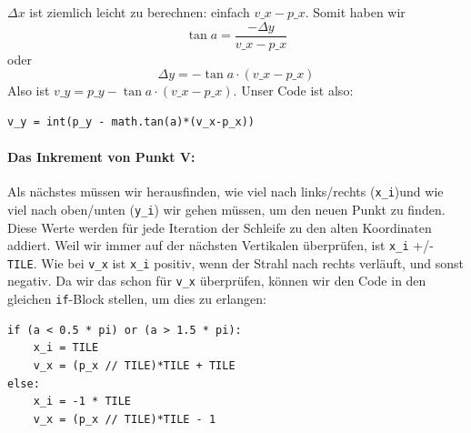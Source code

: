 \documentclass[a4paper,12pt]{report}
\begin{document}
$\Delta x$ ist ziemlich leicht zu berechnen: einfach $v\_x - p\_x$. Somit haben wir
\[\tan a = \frac{-\Delta y}{v\_x - p\_x}\]
oder \[\Delta y = -\tan a \cdot (v\_x - p\_x)\]
Also ist $v\_y = p\_y - \tan a \cdot (v\_x - p\_x)$. Unser Code ist also:
\begin{Verbatim}[baselinestretch=1.0, xleftmargin=1cm]
v_y = int(p_y - math.tan(a)*(v_x-p_x))
\end{Verbatim}

\paragraph{Das Inkrement von Punkt V:}
Als n\"achstes m\"ussen wir herausfinden, wie viel nach links/rechts (\texttt{x\_i})und wie viel nach oben/unten (\texttt{y\_i}) wir gehen m\"ussen, um den neuen Punkt zu finden. Diese Werte werden f\"ur jede Iteration der Schleife zu den alten Koordinaten addiert. Weil wir immer auf der n\"achsten Vertikalen \"uberpr\"ufen, ist \texttt{x\_i} +/- \texttt{TILE}. Wie bei \texttt{v\_x} ist \texttt{x\_i} positiv, wenn der Strahl nach rechts verl\"auft, und sonst negativ. Da wir das schon f\"ur \texttt{v\_x} \"uberpr\"ufen, k\"onnen wir den Code in den gleichen \texttt{if}-Block stellen, um dies zu erlangen:
\begin{Verbatim}[baselinestretch=1.0, xleftmargin=1cm]
if (a < 0.5 * pi) or (a > 1.5 * pi):
	x_i = TILE
	v_x = (p_x // TILE)*TILE + TILE
else:
	x_i = -1 * TILE
	v_x = (p_x // TILE)*TILE - 1
\end{Verbatim}
\end{document}
